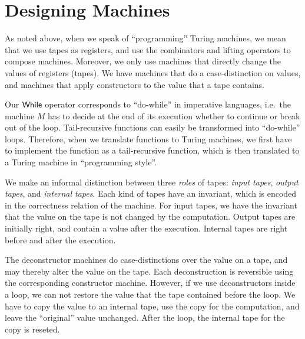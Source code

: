 \section{Designing Machines}
\label{sec:programming-design}
%

As noted above, when we speak of ``programming'' Turing machines, we mean that we use tapes as registers, and use the combinators and lifting
operators to compose machines.  Moreover, we only use machines that directly change the values of registers (tapes).  We have machines that do a
case-distinction on values, and machines that apply constructors to the value that a tape contains.

Our $\mathsf{While}$ operator corresponds to ``do-while'' in imperative languages, i.e.\ the machine $M$ has to decide at the end of its execution whether to
continue or break out of the loop.  Tail-recursive functions can easily be transformed into ``do-while'' loops.  Therefore, when we translate
functions to Turing machines, we first have to implement the function as a tail-recursive function, which is then translated to a Turing machine in
``programming style''.


We make an informal distinction between three \textit{roles} of tapes: \textit{input tapes}, \textit{output tapes}, and \textit{internal tapes}.  Each
kind of tapes have an invariant, which is encoded in the correctness relation of the machine.  For input tapes, we have the invariant that the value
on the tape is not changed by the computation.  Output tapes are initially right, and contain a value after the execution.  Internal tapes are right
before and after the execution.

The deconstructor machines do case-distinctions over the value on a tape, and may thereby alter the value on the tape.  Each deconstruction is
reversible using the corresponding constructor machine.  However, if we use deconstructors inside a loop, we can not restore the value that the tape
contained before the loop.  We have to copy the value to an internal tape, use the copy for the computation, and leave the ``original'' value
unchanged.  After the loop, the internal tape for the copy is reseted.


